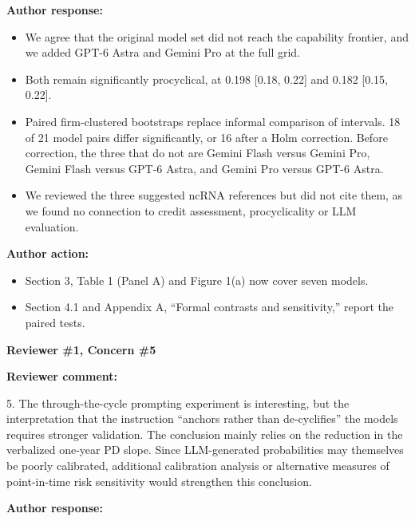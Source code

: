 \documentclass[11pt]{article}
\newcommand{\rvcomment}[1]{{\color{ReviewerGreen}#1}}
\newcommand{\concern}[1]{\textbf{\color{ReviewerGreen}#1}}
\begin{document}
\textbf{Author response:}

\begin{itemize}

\item We agree that the original model set did not reach the capability frontier, and we added GPT-6 Astra and Gemini Pro at the full grid.

\item Both remain significantly procyclical, at 0.198 [0.18, 0.22] and 0.182 [0.15, 0.22].

\item Paired firm-clustered bootstraps replace informal comparison of intervals. 18 of 21 model pairs differ significantly, or 16 after a Holm correction. Before correction, the three that do not are Gemini Flash versus Gemini Pro, Gemini Flash versus GPT-6 Astra, and Gemini Pro versus GPT-6 Astra.

\item We reviewed the three suggested ncRNA references but did not cite them, as we found no connection to credit assessment, procyclicality or LLM evaluation.

\end{itemize}

\textbf{Author action:}

\begin{itemize}

\item Section 3, Table 1 (Panel A) and Figure 1(a) now cover seven models.

\item Section 4.1 and Appendix A, ``Formal contrasts and sensitivity,'' report the paired tests.

\end{itemize}

\vspace{12pt}
\concern{Reviewer \#1, Concern \#5}

\concern{Reviewer comment:}

\rvcomment{5. The through-the-cycle prompting experiment is interesting, but the interpretation that the instruction ``anchors rather than de-cyclifies'' the models requires stronger validation. The conclusion mainly relies on the reduction in the verbalized one-year PD slope. Since LLM-generated probabilities may themselves be poorly calibrated, additional calibration analysis or alternative measures of point-in-time risk sensitivity would strengthen this conclusion.}

\textbf{Author response:}
\end{document}
